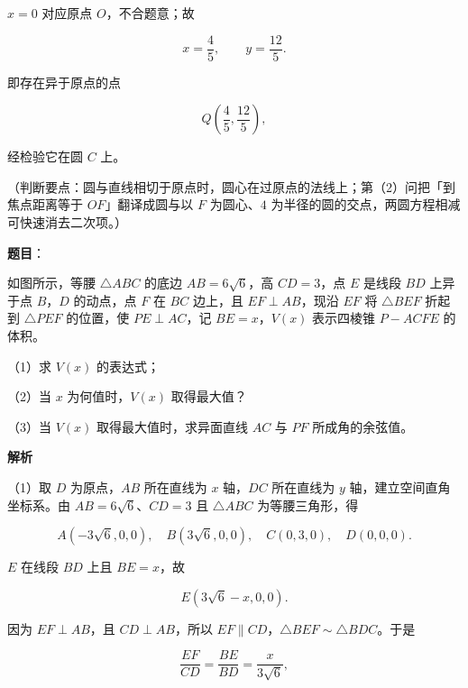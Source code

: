 \begin{answer}
$x=0$ 对应原点 $O$，不合题意；故

\nopagebreak[4]
\[x=\frac45,\qquad y=\frac{12}{5}.\]

即存在异于原点的点

\nopagebreak[4]
\[Q\left(\frac45,\frac{12}{5}\right),\]

经检验它在圆 $C$ 上。

（判断要点：圆与直线相切于原点时，圆心在过原点的法线上；第（2）问把「到焦点距离等于 $OF$」翻译成圆与以 $F$ 为圆心、$4$ 为半径的圆的交点，两圆方程相减可快速消去二次项。）


\end{answer}
\begin{answer}

\textbf{题目}：

如图所示，等腰 $\triangle ABC$ 的底边 $AB=6\sqrt6$，高 $CD=3$，点 $E$ 是线段 $BD$ 上异于点 $B$，$D$ 的动点，点 $F$ 在 $BC$ 边上，且 $EF\perp AB$，现沿 $EF$ 将 $\triangle BEF$ 折起到 $\triangle PEF$ 的位置，使 $PE\perp AC$，记 $BE=x$，$V(x)$ 表示四棱锥 $P-ACFE$ 的体积。

（1）求 $V(x)$ 的表达式；

（2）当 $x$ 为何值时，$V(x)$ 取得最大值？

（3）当 $V(x)$ 取得最大值时，求异面直线 $AC$ 与 $PF$ 所成角的余弦值。
\nopagebreak[4]
\begin{center}\end{center}
\nopagebreak[4]
\textbf{解析}

（1）取 $D$ 为原点，$AB$ 所在直线为 $x$ 轴，$DC$ 所在直线为 $y$ 轴，建立空间直角坐标系。由 $AB=6\sqrt6$、$CD=3$ 且 $\triangle ABC$ 为等腰三角形，得

\nopagebreak[4]
\[A(-3\sqrt6,0,0),\quad B(3\sqrt6,0,0),\quad C(0,3,0),\quad D(0,0,0).\]

$E$ 在线段 $BD$ 上且 $BE=x$，故

\nopagebreak[4]
\[E(3\sqrt6-x,0,0).\]

因为 $EF\perp AB$，且 $CD\perp AB$，所以 $EF\parallel CD$，$\triangle BEF\sim\triangle BDC$。于是

\nopagebreak[4]
\[\frac{EF}{CD}=\frac{BE}{BD}=\frac{x}{3\sqrt6},\]


\end{answer}
